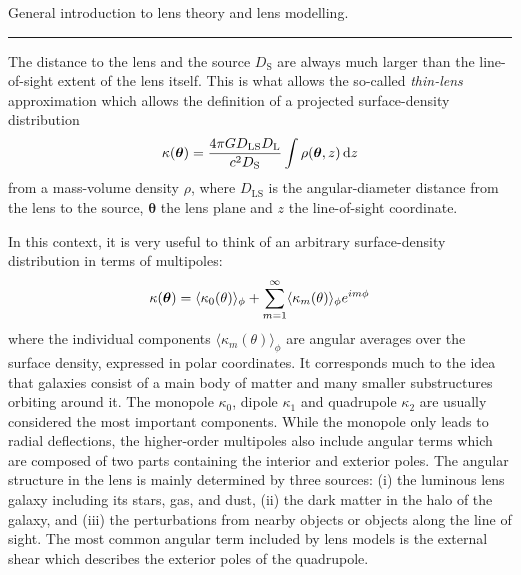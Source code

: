 
General introduction to lens theory and lens modelling.

\par\noindent\rule{\textwidth}{0.8pt}

The distance to the lens and the source $D_\mathrm{S}$ are always much larger
than the line-of-sight extent of the lens itself. This is what allows the
so-called \textit{thin-lens} approximation which allows the definition of a
projected surface-density distribution
%
\begin{equation}\eqlbl{match:thinlens}
  \kappa(\bm\theta) = \frac{4\pi GD_\mathrm{LS}D_\mathrm{L}}{c^2D_\mathrm{S}}
    \int \rho(\bm\theta, z)\,\mathrm{d}z
\end{equation}
%
from a mass-volume density $\rho$, where $D_\mathrm{LS}$ is the angular-diameter
distance from the lens to the source, $\bm\theta$ the lens plane and $z$ the
line-of-sight coordinate.

In this context, it is very useful to think of an arbitrary surface-density
distribution in terms of multipoles:
%
\begin{equation}\eqlbl{match:multipoles}%
  \kappa(\bm\theta) = \langle\kappa_0(\theta)\rangle_{\phi} 
  + \sum^{\infty}_{m=1} \langle\kappa_{m}(\theta)\rangle_{\phi} e^{im\phi}
\end{equation}%
%
where the individual components $\langle\kappa_{m}(\theta)\rangle_{\phi}$ are
angular averages over the surface density, expressed in polar coordinates.  It
corresponds much to the idea that galaxies consist of a main body of matter and
many smaller substructures orbiting around it.  The monopole $\kappa_0$, dipole
$\kappa_1$ and quadrupole $\kappa_2$ are usually considered the most important
components.  While the monopole only leads to radial deflections, the
higher-order multipoles also include angular terms which are composed of two
parts containing the interior and exterior poles.  The angular structure in the
lens is mainly determined by three sources: (i) the luminous lens galaxy
including its stars, gas, and dust, (ii) the dark matter in the halo of the
galaxy, and (iii) the perturbations from nearby objects or objects along the
line of sight.  The most common angular term included by lens models is the
external shear which describes the exterior poles of the quadrupole.

